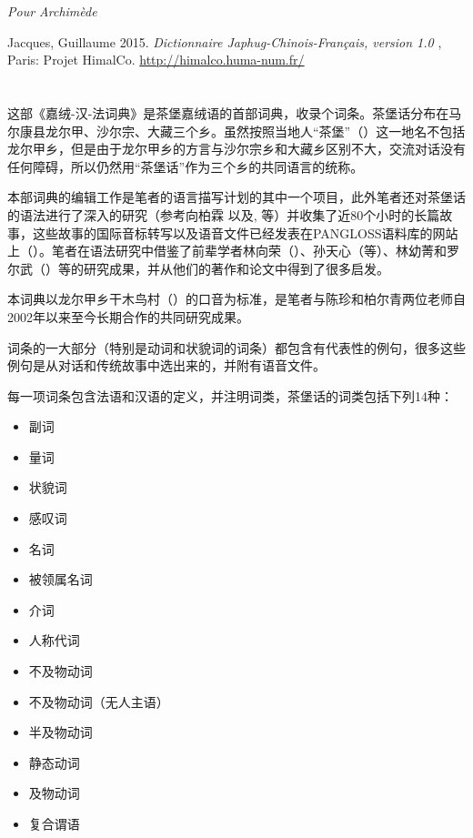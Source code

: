 \begin{flushright}
\textit{Pour Archimède}
\end{flushright}
\begin{bottompar}
Jacques, Guillaume 2015. \textit{Dictionnaire Japhug-Chinois-Français, version 1.0} , Paris: Projet HimalCo. \url{http://himalco.huma-num.fr/}
\end{bottompar}

\newpage
\cn
\section*{}

这部《嘉绒-汉-法词典》是茶堡嘉绒语的首部词典，收录个词条。茶堡话分布在马尔康县龙尔甲、沙尔宗、大藏三个乡。虽然按照当地人“茶堡”（）这一地名不包括龙尔甲乡，但是由于龙尔甲乡的方言与沙尔宗乡和大藏乡区别不大，交流对话没有任何障碍，所以仍然用“茶堡话”作为三个乡的共同语言的统称。

本部词典的编辑工作是笔者的语言描写计划的其中一个项目，此外笔者还对茶堡话的语法进行了深入的研究（参考向柏霖 \citeyear{jacques08}以及\citealt{jacques12incorp, jacques13tropative, jacques14antipassive,  jacques15spontaneous}, \citeyear{jacques15causative, jacques16relatives}等）并收集了近80个小时的长篇故事，这些故事的国际音标转写以及语音文件已经发表在PANGLOSS语料库的网站上（\citealt{michailovsky14pangloss}）。笔者在语法研究中借鉴了前辈学者林向荣（\citeyear{linxr93jiarong}）、孙天心（\citeyear{jackson00sidaba, jackson04zhuangmaoci, jackson06paisheng, jackson14morpho}等）、林幼菁和罗尔武（\citeyear{linluo03}）等的研究成果，并从他们的著作和论文中得到了很多启发。


本词典以龙尔甲乡干木鸟村（）的口音为标准，是笔者与陈珍和柏尔青两位老师自2002年以来至今长期合作的共同研究成果。

词条的一大部分（特别是动词和状貌词的词条）都包含有代表性的例句，很多这些例句是从对话和传统故事中选出来的，并附有语音文件。

每一项词条包含法语和汉语的定义，并注明词类，茶堡话的词类包括下列14种：

\begin{itemize}
\item {} 副词
\item {} 量词
\item {} 状貌词
\item {} 感叹词
\item {} 名词
\item {} 被领属名词
\item {} 介词
\item {} 人称代词
\item {} 不及物动词
\item {} 不及物动词（无人主语）
\item {} 半及物动词
\item {} 静态动词
\item {} 及物动词
\item {} 复合谓语
\end{itemize}

